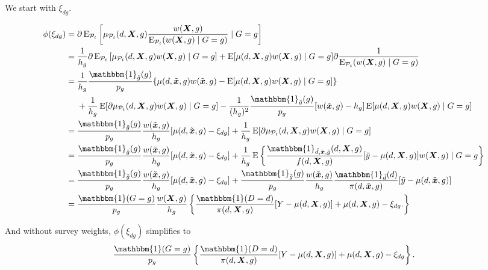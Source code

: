 \documentclass[12pt,a4paper]{article}
\newcommand{\E}{\operatorname{E}}
\def\X{{\boldsymbol X}}
\def\x{{\boldsymbol x}}
\def\one{\mathbbm{1}}
\begin{document}
We start with $\xi_{dg}$.

\begin{align*}
    \phi(\xi_{dg}) &= \partial \E_{\mathcal{P}_t} \left[\mu_{\mathcal{P}_t}(d,\X,g) \frac{w(\X,g)}{\E_{\mathcal{P}_t}(w(\X,g) \mid G=g)}  \mid G=g \right] \\
    &= \frac{1}{h_g} \partial \E_{\mathcal{P}_t} \left[\mu_{\mathcal{P}_t}(d,\X,g) w(\X,g)  \mid G=g \right] +  \E[\mu(d,\X,g)w(\X,g) \mid G=g] \partial \frac{1}{\E_{\mathcal{P}_t}(w(\X,g)\mid G=g)} \\
    &= \frac{1}{h_g}\frac{\one_{\Tilde{g}}(g)}{p_g}  \{\mu(d,\Tilde{\x},g)w(\Tilde{\x},g) -\E[\mu(d,\X,g)w(\X,g) \mid G=g]\}  \\
    &\phantom{{}={}} + \frac{1}{h_g} \E[\partial  \mu_{\mathcal{P}_t}(d,\X,g)w(\X,g) \mid G=g ] - \frac{1}{(h_g)^2}\frac{\one_{\Tilde{g}}(g)}{p_g}[w(\Tilde{\x},g)-h_g]\E[\mu(d,\X,g)w(\X,g) \mid G=g] \\
    &= \frac{\one_{\Tilde{g}}(g)}{p_g}  \frac{w(\Tilde{\x},g)}{h_g} [\mu(d,\Tilde{\x},g)-\xi_{dg}] + \frac{1}{h_g} \E[\partial  \mu_{\mathcal{P}_t}(d,\X,g)w(\X,g) \mid G=g ] \\
    &= \frac{\one_{\Tilde{g}}(g)}{p_g}  \frac{w(\Tilde{\x},g)}{h_g} [\mu(d,\Tilde{\x},g)-\xi_{dg}] + \frac{1}{h_g} \E \left\{ \frac{\one_{\Tilde{d},\Tilde{\x},\Tilde{g}}(d,\X,g)}{f(d,\X,g)} [\Tilde{y}-\mu(d,\X,g)] w(\X,g) \mid G=g \right\} \\
        &= \frac{\one_{\Tilde{g}}(g)}{p_g}  \frac{w(\Tilde{\x},g)}{h_g} [\mu(d,\Tilde{\x},g)-\xi_{dg}] + \frac{\one_{\Tilde{g}}(g)}{p_g} \frac{w(\Tilde{\x},g)}{h_g} \frac{\one_{\Tilde{d}}(d)}{\pi(d, \Tilde{\x},g)} [\Tilde{y}-\mu(d,\Tilde{\x},g)] \\
    &= \frac{\one(G=g)}{p_g}\frac{w(\X,g)}{h_g}\left\{ \frac{\one(D=d)}{\pi(d, \X,g)} [Y-\mu(d,\X,g)] + \mu(d,\X,g) - \xi_{dg}. \right\}
\end{align*}

And without survey weights, $\phi(\xi_{dg})$ simplifies to
$$\frac{\one(G=g)}{p_g} \left\{ \frac{\one(D=d)}{\pi(d, \X,g)} [Y-\mu(d,\X,g)] + \mu(d,\X,g) - \xi_{dg} \right\}.$$
\end{document}
